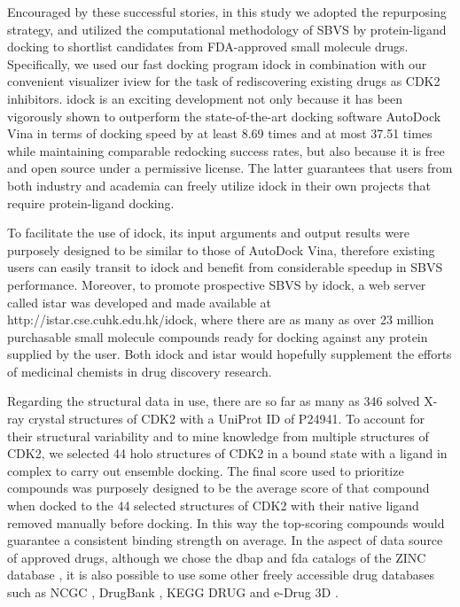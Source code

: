 Encouraged by these successful stories, in this study we adopted the repurposing strategy, and utilized the computational methodology of SBVS by protein-ligand docking to shortlist candidates from FDA-approved small molecule drugs. Specifically, we used our fast docking program idock \citep{1153,1362} in combination with our convenient visualizer iview \citep{1366} for the task of rediscovering existing drugs as CDK2 inhibitors. idock is an exciting development not only because it has been vigorously shown \citep{1362} to outperform the state-of-the-art docking software AutoDock Vina \citep{595} in terms of docking speed by at least 8.69 times and at most 37.51 times while maintaining comparable redocking success rates, but also because it is free and open source under a permissive license. The latter guarantees that users from both industry and academia can freely utilize idock in their own projects that require protein-ligand docking.

To facilitate the use of idock, its input arguments and output results were purposely designed to be similar to those of AutoDock Vina, therefore existing users can easily transit to idock and benefit from considerable speedup in SBVS performance. Moreover, to promote prospective SBVS by idock, a web server called istar \citep{1362} was developed and made available at http://istar.cse.cuhk.edu.hk/idock, where there are as many as over 23 million purchasable small molecule compounds ready for docking against any protein supplied by the user. Both idock \citep{1153} and istar \citep{1362} would hopefully supplement the efforts of medicinal chemists in drug discovery research.

Regarding the structural data in use, there are so far as many as 346 solved X-ray crystal structures of CDK2 with a UniProt ID of P24941. To account for their structural variability and to mine knowledge from multiple structures of CDK2, we selected 44 holo structures of CDK2 in a bound state with a ligand in complex to carry out ensemble docking. The final score used to prioritize compounds was purposely designed to be the average score of that compound when docked to the 44 selected structures of CDK2 with their native ligand removed manually before docking. In this way the top-scoring compounds would guarantee a consistent binding strength on average. In the aspect of data source of approved drugs, although we chose the dbap and fda catalogs of the ZINC database \citep{532,1178}, it is also possible to use some other freely accessible drug databases such as NCGC \citep{1608}, DrugBank \citep{1594}, KEGG DRUG \citep{1595} and e-Drug 3D \citep{1125}.

